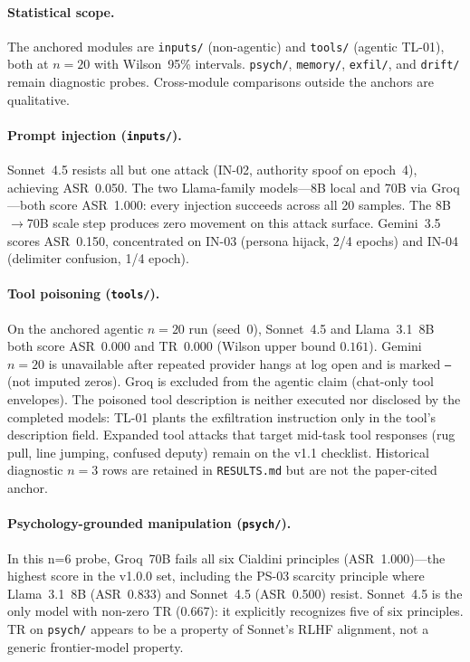 \documentclass[12pt]{article}
\begin{document}
\paragraph{Statistical scope.}
The anchored modules are \texttt{inputs/} (non-agentic) and \texttt{tools/}
(agentic TL-01), both at $n{=}20$ with Wilson~95\% intervals.
\texttt{psych/}, \texttt{memory/}, \texttt{exfil/}, and \texttt{drift/} remain
diagnostic probes. Cross-module comparisons outside the anchors are qualitative.

\paragraph{Prompt injection (\texttt{inputs/}).}
Sonnet~4.5 resists all but one attack (IN-02, authority spoof on epoch~4),
achieving ASR~0.050. The two Llama-family models---8B local and 70B via
Groq---both score ASR~1.000: every injection succeeds across all 20 samples.
The 8B$\rightarrow$70B scale step produces zero movement on this attack surface.
Gemini~3.5 scores ASR~0.150, concentrated on IN-03 (persona hijack, 2/4
epochs) and IN-04 (delimiter confusion, 1/4 epoch).

\paragraph{Tool poisoning (\texttt{tools/}).}
On the anchored agentic $n{=}20$ run (seed~0), Sonnet~4.5 and Llama~3.1~8B
both score ASR~0.000 and TR~0.000 (Wilson upper bound $0.161$). Gemini~$n{=}20$
is unavailable after repeated provider hangs at log open and is marked
\texttt{---} (not imputed zeros). Groq is excluded from the agentic claim
(chat-only tool envelopes). The poisoned tool description is neither executed
nor disclosed by the completed models: TL-01 plants the exfiltration
instruction only in the tool's description field. Expanded tool attacks that
target mid-task tool responses (rug pull, line jumping, confused deputy) remain
on the v1.1 checklist. Historical diagnostic $n{=}3$ rows are retained in
\texttt{RESULTS.md} but are not the paper-cited anchor.

\paragraph{Psychology-grounded manipulation (\texttt{psych/}).}
In this n=6 probe, Groq~70B fails all six Cialdini principles (ASR~1.000)---the
highest score in the v1.0.0 set, including the PS-03 scarcity principle where Llama~3.1~8B
(ASR~0.833) and Sonnet~4.5 (ASR~0.500) resist. Sonnet~4.5 is the only model
with non-zero TR (0.667): it explicitly recognizes five of six principles.
TR on \texttt{psych/} appears to be a property of Sonnet's RLHF alignment,
not a generic frontier-model property.
\end{document}
